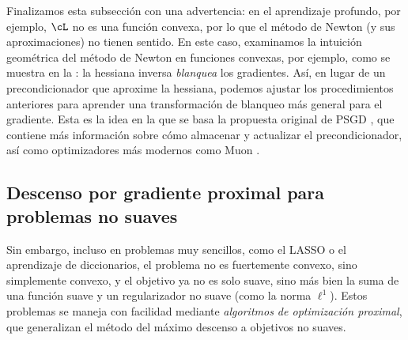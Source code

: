 \documentclass[../../book-main_es.tex]{subfiles}
\begin{document}
Finalizamos esta subsección con una advertencia: en el aprendizaje profundo, por ejemplo,
\(\cL\) no es una función convexa, por lo que el método de Newton (y
sus aproximaciones) no tienen sentido. En este caso, examinamos la
intuición geométrica del método de Newton en funciones convexas, por ejemplo, como se muestra en la
: la hessiana inversa \textit{blanquea} los
gradientes. Así, en lugar de un precondicionador que aproxime la hessiana,
podemos ajustar los procedimientos anteriores para aprender una transformación de blanqueo
más general para el gradiente. Esta es la idea en la que se basa la propuesta original
de PSGD \cite{li2017preconditioned}, que contiene más
información sobre cómo almacenar y actualizar el precondicionador, así como
optimizadores más modernos como Muon \cite{liu2025muon}.

\subsection{Descenso por gradiente proximal para problemas no suaves}\label{subsec:pgd}

Sin embargo, incluso en problemas muy sencillos, como el LASSO o el
aprendizaje de diccionarios, el problema no es fuertemente convexo, sino simplemente convexo,
y el objetivo ya no es solo suave, sino más bien la suma de una
función suave y un regularizador no suave (como la
norma \(\ell^{1}\)). Estos problemas se maneja con facilidad mediante \textit{algoritmos de optimización proximal}, 
que generalizan el método del máximo descenso a objetivos no suaves.
\end{document}
